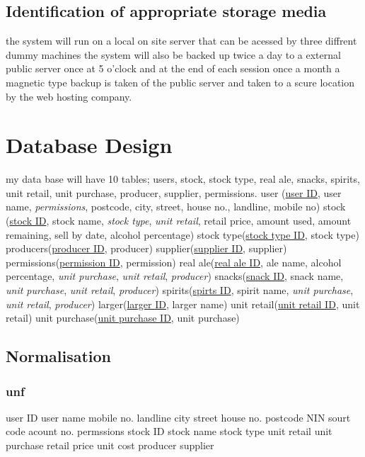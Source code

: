 \subsection{Identification of appropriate storage media}

the system will run on a local on site server that can be acessed by three diffrent dummy machines the system will also be backed up twice a day to a external public server once at 5 o'clock and at the end of each session once a month a magnetic type backup is taken of the public server and taken to a scure location by the web hosting company.

\section{Database Design}

my data base will have 10 tables; users, stock, stock type, real ale, snacks, spirits, unit retail, unit purchase, producer, supplier, permissions.
user (\underline{user ID}, user name, \emph{permissions}, postcode, city, street, house no., landline, mobile no)
stock (\underline{stock ID}, stock name, \emph{stock type}, \emph{unit retail}, retail price, amount used, amount remaining, sell by date, alcohol percentage)
stock type(\underline{stock type ID}, stock type)
producers(\underline{producer ID}, producer)
supplier(\underline{supplier ID}, supplier)
permissions(\underline{permission ID}, permission)
real ale(\underline{real ale ID}, ale name, alcohol percentage, \emph{unit purchase}, \emph{unit retail}, \emph{producer})
snacks(\underline{snack ID}, snack name, \emph{unit purchase}, \emph{unit retail}, \emph{producer})
spirits(\underline{spirts ID}, spirit name, \emph{unit purchase}, \emph{unit retail}, \emph{producer})
larger(\underline{larger ID}, larger name)
unit retail(\underline{unit retail ID}, unit retail)
unit purchase(\underline{unit purchase ID}, unit purchase)

\subsection{Normalisation}

\subsubsection{unf}

user ID
user name
mobile no.
landline
city
street
house no.
postcode
NIN
sourt code
acount no.
permssions
stock ID 
stock name
stock type
unit retail
unit purchase
retail price
unit cost
producer
supplier




